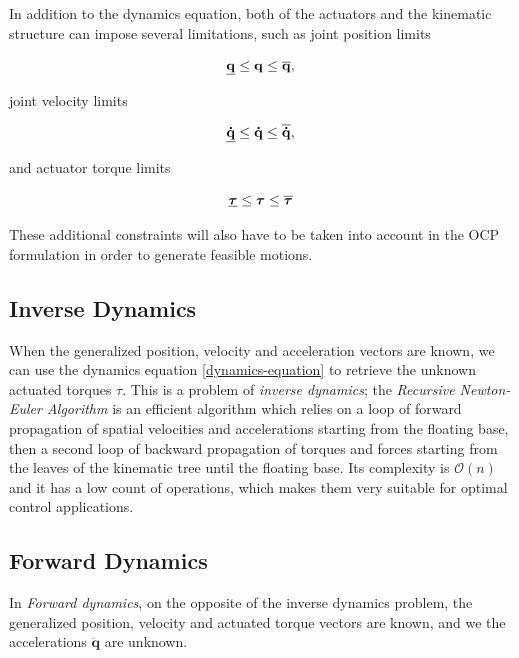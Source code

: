 In addition to the dynamics equation, both of the actuators and the
kinematic structure can impose several limitations, such as joint
position limits

\begin{equation}
  \underline{\mathbf{q}} \le \mathbf{q} \le \overline{\mathbf{q}},
\end{equation}

joint velocity limits

\begin{equation}
  \underline{\mathbf{\dot{q}}} \le \mathbf{\dot{q}} \le
  \overline{\mathbf{\dot{q}}},
\end{equation}

and actuator torque limits

\begin{equation}
  \underline{\boldsymbol{\tau}} \le \boldsymbol{\tau} \le
  \overline{\boldsymbol{\tau}}
\end{equation}

These additional constraints will also have to be taken into account
in the OCP formulation in order to generate feasible motions.

\subsection{Inverse Dynamics}

When the generalized position, velocity and acceleration vectors are
known, we can use the dynamics equation \ref{dynamics-equation} to
retrieve the unknown actuated torques $\mathbb{\tau}$. This is a
problem of \emph{inverse dynamics}; the \emph{Recursive Newton-Euler
  Algorithm} is an efficient algorithm which relies on a loop of
forward propagation of spatial velocities and accelerations starting
from the floating base, then a second loop of backward propagation of
torques and forces starting from the leaves of the kinematic tree
until the floating base. Its complexity is $\mathcal{O}(n)$ and it has
a low count of operations, which makes them very suitable for optimal
control applications.

\subsection{Forward Dynamics}

In \emph{Forward dynamics}, on the opposite of the inverse dynamics
problem, the generalized position, velocity and actuated torque
vectors are known, and we the accelerations $\ddot{\mathbf{q}}$ are
unknown.

